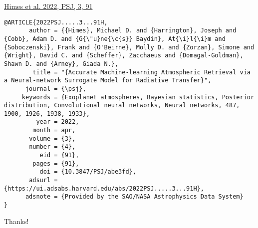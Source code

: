 \documentclass[letterpaper, 12pt]{article}
\begin{document}
\href{https://iopscience.iop.org/article/10.3847/PSJ/abe3fd/meta}{Himes et al. 2022, PSJ, 3, 91}

\begin{verbatim}
@ARTICLE{2022PSJ.....3...91H,
       author = {{Himes}, Michael D. and {Harrington}, Joseph and {Cobb}, Adam D. and {G{\"u}ne{\c{s}} Baydin}, At{\i}l{\i}m and {Soboczenski}, Frank and {O'Beirne}, Molly D. and {Zorzan}, Simone and {Wright}, David C. and {Scheffer}, Zacchaeus and {Domagal-Goldman}, Shawn D. and {Arney}, Giada N.},
        title = "{Accurate Machine-learning Atmospheric Retrieval via a Neural-network Surrogate Model for Radiative Transfer}",
      journal = {\psj},
     keywords = {Exoplanet atmospheres, Bayesian statistics, Posterior distribution, Convolutional neural networks, Neural networks, 487, 1900, 1926, 1938, 1933},
         year = 2022,
        month = apr,
       volume = {3},
       number = {4},
          eid = {91},
        pages = {91},
          doi = {10.3847/PSJ/abe3fd},
       adsurl = {https://ui.adsabs.harvard.edu/abs/2022PSJ.....3...91H},
      adsnote = {Provided by the SAO/NASA Astrophysics Data System}
}
\end{verbatim}

\noindent Thanks!


\end{document}
